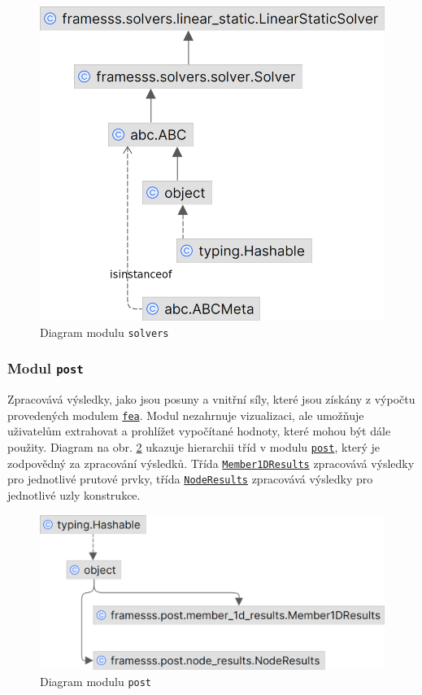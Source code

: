 \begin{figure}[H]
    \includegraphics{assets/figures/framesss/uml/solvers.png}
    \caption{Diagram modulu \texttt{solvers}}
    \label{fig:modul_solvers}
\end{figure}

\subsubsection*{Modul \texttt{post}}
Zpracovává výsledky, jako jsou posuny a vnitřní síly, které jsou získány z výpočtu provedených modulem \href{https://danberanek.github.io/framesss/gen/framesss.fea.html}{\texttt{fea}}. Modul nezahrnuje vizualizaci, ale umožňuje uživatelům extrahovat a prohlížet vypočítané hodnoty, které mohou být dále použity.
Diagram na obr. \ref{fig:modul_post} ukazuje hierarchii tříd v modulu \href{https://danberanek.github.io/framesss/gen/framesss.post.html}{\texttt{post}}, který je zodpovědný za zpracování výsledků. Třída 
\href{https://danberanek.github.io/framesss/gen/framesss.post.member_1d_results.Member1DResults.html#framesss.post.member_1d_results.Member1DResults}{\texttt{Member1DResults}} zpracovává výsledky pro jednotlivé prutové prvky, třída
\href{https://danberanek.github.io/framesss/gen/framesss.post.node_results.NodeResults.html}{\texttt{NodeResults}} zpracovává výsledky pro jednotlivé uzly konstrukce.
\begin{figure}[H]
    \includegraphics{assets/figures/framesss/uml/post.png}
    \caption{Diagram modulu \texttt{post}}
    \label{fig:modul_post}
\end{figure}
